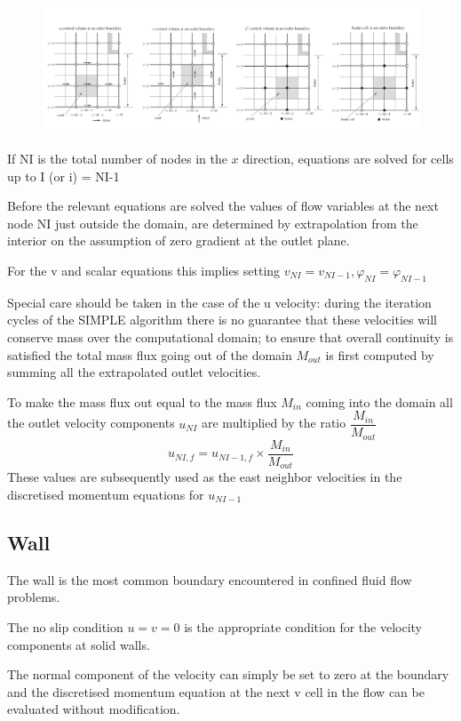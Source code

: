 \documentclass[a4paper, 15pt]{article}
\begin{document}
\begin{figure}[H]
	\centering
	\label{fig:screenshot033}
	\includegraphics[width=0.7\linewidth]{fig/screenshot033}
\end{figure}

If
NI is the total number of nodes in the $x$ direction, equations are solved for cells up to I (or i) = 
NI-1

Before
the relevant equations are solved the values of flow variables at the next node NI just
outside the domain, are determined by extrapolation from the interior on the assumption of zero
gradient at the outlet plane. 

For
the v and scalar equations this implies setting $v_{NI}=v_{NI-1}, \varphi_{NI} = \varphi_{NI-1}$

Special
care should be taken in the case of the u velocity: during
the iteration cycles of the SIMPLE algorithm there is no guarantee that these velocities
will conserve mass over the computational domain; to
ensure that overall continuity is satisfied the total mass flux going out of the domain $M_{out}$ is
first computed by summing all the extrapolated outlet velocities. \newline

To
make the mass flux out equal to the mass flux $M_{in}$ coming into the domain all the outlet
velocity components $u_{NI}$ are multiplied by the ratio $\dfrac{M_{in}}{M_{out}}$
\[u_{NI,f} = u_{NI-1,f}\times\dfrac{M_{in}}{M_{out}}\]
These
values are subsequently used as the east neighbor velocities in the discretised
momentum equations for $u_{NI-1}$

\subsection*{Wall}
The
wall is the most common boundary encountered in confined fluid flow problems. \newline 

The
no slip condition $u=v=0$ is the appropriate condition for the velocity components at solid
walls. \newline 

The
normal component of the velocity can simply be set to zero at the boundary and the
discretised momentum equation at the next v cell in the flow can be evaluated without
modification. \newline 
\end{document}
